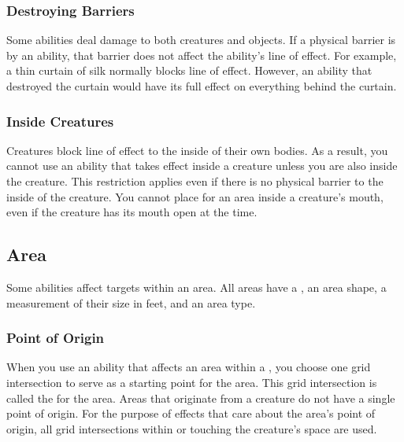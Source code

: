         \subsubsection{Destroying Barriers}\label{Destroying Barriers}
            Some abilities deal damage to both creatures and objects.
            If a physical barrier is  by an ability, that barrier does not affect the ability's line of effect.
            For example, a thin curtain of silk normally blocks line of effect.
            However, an ability that destroyed the curtain would have its full effect on everything behind the curtain.

        \subsubsection{Inside Creatures}
            Creatures block line of effect to the inside of their own bodies.
            As a result, you cannot use an ability that takes effect inside a creature unless you are also inside the creature.
            This restriction applies even if there is no physical barrier to the inside of the creature.
            You cannot place  for an area inside a creature's mouth, even if the creature has its mouth open at the time.

    \subsection{Area}\label{Area}

        Some abilities affect targets within an area.
        All areas have a , an area shape, a measurement of their size in feet, and an area type.

        \subsubsection{Point of Origin}\label{Point of Origin}
            When you use an ability that affects an area within a , you choose one grid intersection to serve as a starting point for the area.
            This grid intersection is called the  for the area.
            Areas that originate from a creature do not have a single point of origin.
            For the purpose of effects that care about the area's point of origin, all grid intersections within or touching the creature's space are used.

